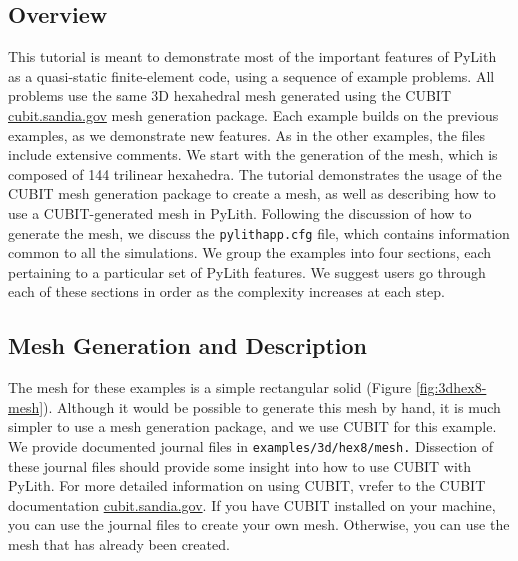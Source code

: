 \subsection{Overview}

This tutorial is meant to demonstrate most of the important features
of PyLith as a quasi-static finite-element code, using a sequence
of example problems. All problems use the same 3D hexahedral mesh
generated using the CUBIT \url{cubit.sandia.gov} mesh generation
package. Each example builds on the previous examples, as we demonstrate
new features. As in the other examples, the files include extensive
comments. We start with the generation of the mesh, which is composed
of 144 trilinear hexahedra. The tutorial demonstrates the usage of
the CUBIT mesh generation package to create a mesh, as well as describing
how to use a CUBIT-generated mesh in PyLith. Following the discussion
of how to generate the mesh, we discuss the \texttt{pylithapp.cfg}
file, which contains information common to all the simulations. We
group the examples into four sections, each pertaining to a particular
set of PyLith features. We suggest users go through each of these
sections in order as the complexity increases at each step. 


\subsection{Mesh Generation and Description}

The mesh for these examples is a simple rectangular solid (Figure
\vref{fig:3dhex8-mesh}). Although it would be possible to generate
this mesh by hand, it is much simpler to use a mesh generation package,
and we use CUBIT for this example. We provide documented journal files
in \texttt{examples/3d/hex8/mesh.} Dissection of these journal files
should provide some insight into how to use CUBIT with PyLith. For
more detailed information on using CUBIT, vrefer to the CUBIT documentation
\url{cubit.sandia.gov}. If you have CUBIT installed on your machine,
you can use the journal files to create your own mesh. Otherwise,
you can use the mesh that has already been created.

